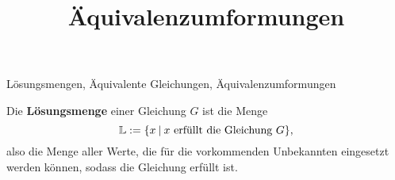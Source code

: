\documentclass[solution]{uebungsblatt}
\title{Äquivalenzumformungen}
\begin{document}
\maketitle
\begin{contents}
    Lösungsmengen, Äquivalente Gleichungen, Äquivalenzumformungen
\end{contents}


\begin{definition}
    Die \textbf{Lösungsmenge} einer Gleichung $G$ ist die Menge 
    \[\mathbb{L}:=\{x\:|\:x~\text{erfüllt die Gleichung~}G\},\]
    also die Menge aller Werte, die für die vorkommenden Unbekannten eingesetzt werden können, sodass die Gleichung erfüllt ist.
\end{definition}
%
\end{document}

